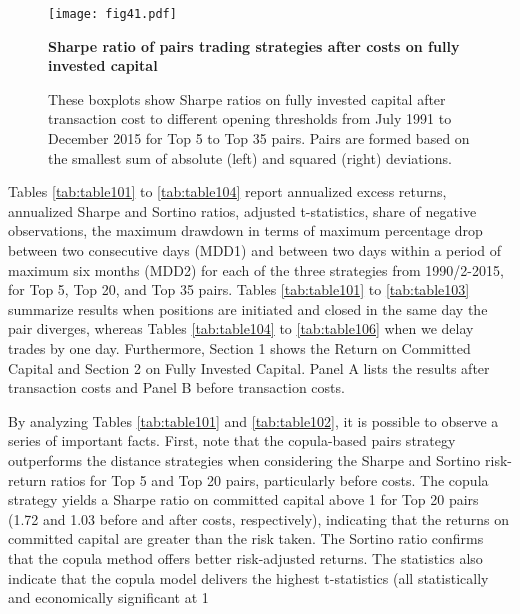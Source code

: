 \documentclass[a4paper]{article}
\begin{document}
	\begin{figure}[H]
		\centering \tiny
		\texttt{[image: fig41.pdf]}
		\caption{\textbf {Sharpe ratio of pairs trading strategies after costs on fully invested capital}}
		\caption*{\justifying \tiny These boxplots show Sharpe ratios on fully invested capital after transaction cost to different opening thresholds from July 1991 to December 2015 for Top 5 to Top 35 pairs. Pairs are formed based on the smallest sum of absolute (left) and squared (right) deviations.}
		\label{fig:fig42}
	\end{figure}
	
	
Tables \ref{tab:table101} to \ref{tab:table104} report annualized excess returns, annualized Sharpe and Sortino ratios, \citet*{nw87} adjusted t-statistics, share of negative observations, the maximum drawdown in terms of maximum percentage drop between two consecutive days (MDD1) and between two days within a period of maximum six months (MDD2) for each of the three strategies from 1990/2-2015, for Top 5, Top 20, and Top 35 pairs. Tables \ref{tab:table101} to \ref{tab:table103} summarize results when positions are initiated and closed in the same day the pair diverges, whereas Tables \ref{tab:table104} to \ref{tab:table106} when we delay trades by one day. Furthermore, Section 1 shows the Return on Committed Capital and Section 2 on Fully Invested Capital. Panel A lists the results after transaction costs and Panel B before transaction costs. 	
	
By analyzing Tables \ref{tab:table101} and \ref{tab:table102}, it is possible to observe a series of important facts. First, note that the copula-based pairs strategy outperforms the distance strategies when considering the Sharpe and Sortino risk-return ratios for Top 5 and Top 20 pairs, particularly before costs. The copula strategy yields a Sharpe ratio on committed capital above 1 for Top 20 pairs (1.72 and 1.03 before and after costs, respectively), indicating that the returns on committed capital are greater than the risk taken. The Sortino ratio confirms that the copula method offers better risk-adjusted returns. The statistics also indicate that the copula model delivers the highest t-statistics (all statistically and economically significant at 1\\%
\end{document}
